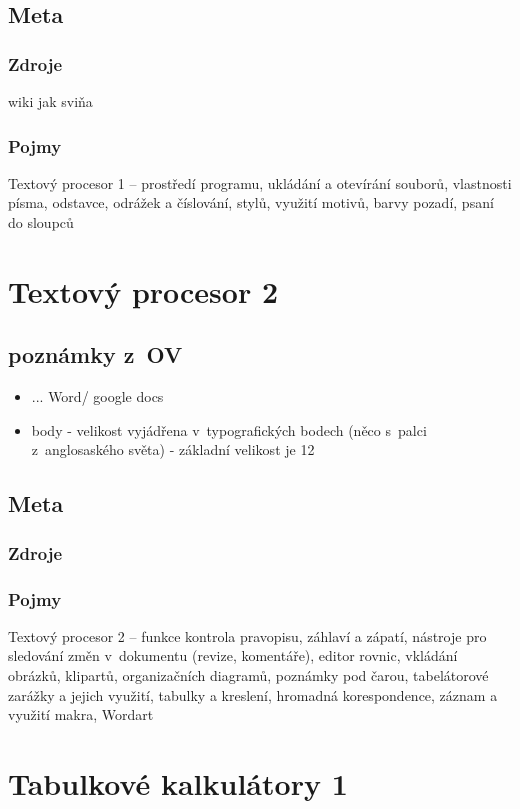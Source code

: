 \documentclass[12pt]{article}
\begin{document}
\subsection{Meta}
\subsubsection{Zdroje}
wiki jak sviňa
\subsubsection{Pojmy}
Textový procesor 1 – prostředí programu, ukládání a otevírání souborů, vlastnosti písma, odstavce, odrážek a číslování, stylů, využití motivů, barvy pozadí, psaní do sloupců

\section{Textový procesor 2}
\subsection{poznámky z~OV}
\begin{itemize}
\item ... Word/ google docs
\item body - velikost vyjádřena v~typografických bodech (něco s~palci z~anglosaského světa) - základní velikost je 12 
\end{itemize}

\subsection{Meta}
\subsubsection{Zdroje}
\subsubsection{Pojmy}
Textový procesor 2 – funkce kontrola pravopisu, záhlaví a zápatí, nástroje pro sledování změn v~dokumentu (revize, komentáře), editor rovnic, vkládání obrázků, klipartů, organizačních diagramů, poznámky pod čarou, tabelátorové zarážky a jejich využití, tabulky a kreslení, hromadná korespondence, záznam a využití makra, Wordart

\section{Tabulkové kalkulátory 1}
\end{document}

